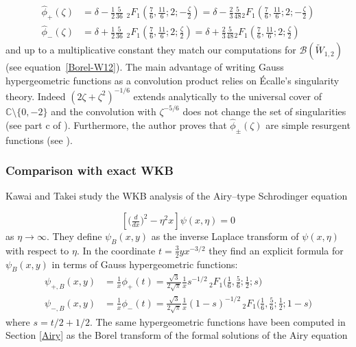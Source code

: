 \documentclass{article}
\newcommand{\C}{\mathbb{C}}
\newcommand{\series}[1]{\tilde{#1}}
\newcommand{\borel}{\mathcal{B}}
\theoremstyle{definition}
\theoremstyle{plain}
\begin{document}
\begin{align*}
\hat{\phi}_+(\zeta)&=\delta-\frac{1}{2}\frac{5}{36}\,\, {}_2F_1\left(\frac{7}{6},\frac{11}{6};2;-\frac{\zeta}{2}\right)=\delta-\frac{2}{3}\frac{5}{48} {}_2F_1\left(\frac{7}{6},\frac{11}{6};2;-\frac{\zeta}{2}\right)\\
\hat{\phi}_-(\zeta)&=\delta+\frac{1}{2}\frac{5}{36}\,\, {}_2F_1\left(\frac{7}{6},\frac{11}{6};2;\frac{\zeta}{2}\right)=\delta+\frac{2}{3}\frac{5}{48} {}_2F_1\left(\frac{7}{6},\frac{11}{6};2;\frac{\zeta}{2}\right)
\end{align*} 
and up to a multiplicative constant they match our computations for $\borel(\tilde{W}_{1,2})$ (see equation~\eqref{Borel-W12}).
The main advantage of writing Gauss hypergeometric functions as a convolution product relies on \'Ecalle's singularity theory. Indeed $(2\zeta+\zeta^2)^{-1/6}$ extends analytically to the universal cover of $\C\setminus\lbrace 0,-2\rbrace$ and the convolution with $\zeta^{-5/6}$ does not change the set of singularities (see part c of \cite[Section 6.14.5]{diverg-resurg-i}). Furthermore, the author proves that $\hat{\phi}_{\pm}(\zeta)$ are simple resurgent functions (see \cite[Lemma 6.106]{diverg-resurg-i}). %

\subsubsection{Comparison with exact WKB}

Kawai and Takei study the WKB analysis of the Airy--type Schrodinger equation

\begin{equation}
\label{WKB_Airy} 
\left[\big(\tfrac{d}{dx}\big)^2 - \eta^2 x \right] \psi(x, \eta) = 0 
\end{equation}
as $\eta\to\infty$. They define $\psi_B(x, y)$ as the inverse Laplace transform of $\psi(x, \eta)$ with respect to $\eta$. In the coordinate $t=\frac{3}{2}yx^{-3/2}$ they find an explicit formula for $\psi_B(x,y)$ in terms of Gauss hypergeometric functions:
\begin{align*}
\psi_{+,B}(x,y)&=\frac{1}{x}\phi_+(t)=\frac{\sqrt{3}}{2\sqrt{\pi}}\frac{1}{x}s^{-1/2}\, {}_2F_1\big(\tfrac{1}{6},\tfrac{5}{6};\tfrac{1}{2};s\big)\\
\psi_{-,B}(x,y)&=\frac{1}{x}\phi_-(t)=\frac{\sqrt{3}}{2\sqrt{\pi}}\frac{1}{x}(1-s)^{-1/2}\, {}_2F_1\big(\tfrac{1}{6},\tfrac{5}{6};\tfrac{1}{2};1-s\big)
\end{align*}
where $s=t/2+1/2$. 
The same hypergeometric functions have been computed in Section \ref{Airy} as the Borel transform of the formal solutions of the Airy equation
\end{document}
